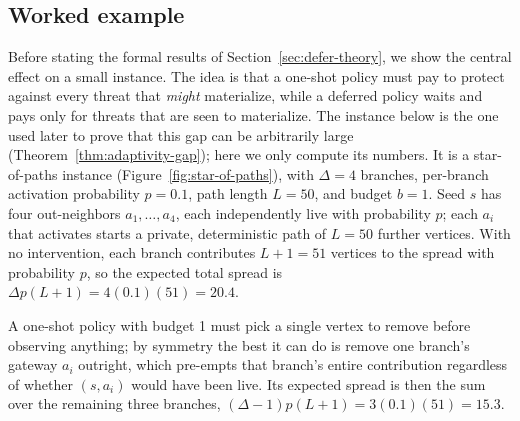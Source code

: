 \documentclass[preprint,11pt]{elsarticle}
\theoremstyle{definition}
\theoremstyle{remark}
\begin{document}
\subsection{Worked example}\label{sec:defer-example}

Before stating the formal results of Section~\ref{sec:defer-theory}, we show
the central effect on a small instance. The idea is that a one-shot policy
must pay to protect against every threat that \emph{might} materialize,
while a deferred policy waits and pays only for threats that are seen to
materialize. The instance below is the one used later to prove that this gap
can be arbitrarily large (Theorem~\ref{thm:adaptivity-gap}); here we only
compute its numbers. It is a star-of-paths instance
(Figure~\ref{fig:star-of-paths}), with $\Delta=4$ branches,
per-branch activation probability $p=0.1$, path length $L=50$, and budget
$b=1$. Seed $s$ has four out-neighbors $a_1,\dots,a_4$, each independently
live with probability $p$; each $a_i$ that activates starts a private,
deterministic path of $L=50$ further vertices. With no intervention, each
branch contributes $L+1=51$ vertices to the spread with probability $p$,
so the expected total spread is $\Delta p(L+1)=4(0.1)(51)=20.4$.

A one-shot policy with budget 1 must pick a single vertex to remove before
observing anything; by symmetry the best it can do is remove one branch's
gateway $a_i$ outright, which pre-empts that branch's entire contribution
regardless of whether $(s,a_i)$ would have been live. Its expected spread
is then the sum over the remaining three branches,
$(\Delta-1)p(L+1)=3(0.1)(51)=15.3$.
\end{document}
